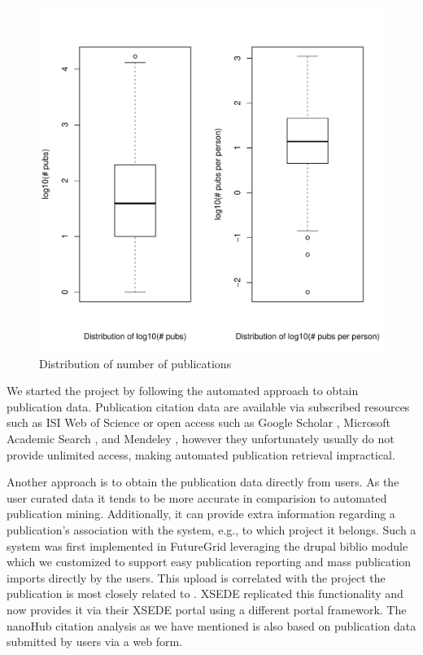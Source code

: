 \documentclass{sig-alternate}
\begin{document}
\begin{figure}[htb] 
  \centering 
    \includegraphics[width=1.0\columnwidth]{images/01_dist_npubs_proj.pdf} 
  \caption{Distribution of number of publications}\label{F:dist-npubs-proj} 
\end{figure} 
 

We started the project by following the automated approach to obtain publication data. Publication citation data are available via subscribed resources such as ISI Web of Science \cite{www-isiwos} or open access such as Google Scholar \cite{www-googlescholar}, Microsoft Academic Search \cite{www-msas}, and Mendeley \cite{www-mendeley}, however they unfortunately usually do not provide unlimited access, making automated publication retrieval impractical. 
 
Another approach is to obtain the publication data directly from users. As the user curated data it tends to be more accurate in comparision to automated publication mining. Additionally, it can provide extra information regarding a publication's association with the system, e.g., to which project it belongs. 
Such a system was first implemented in FutureGrid leveraging the drupal biblio module \cite{www-drupal-bib} which we customized to support easy publication reporting and mass publication imports directly by the users. This upload is correlated with the project the publication is most closely related to \cite{www-fgbiblio}. XSEDE replicated this functionality and now provides it via their XSEDE portal \cite{www-xdportalpub} using a different portal framework. The nanoHub citation analysis \cite{www-nanohubcite} as we have mentioned is also based on publication data submitted by users via a web form. 
 
\end{document}
